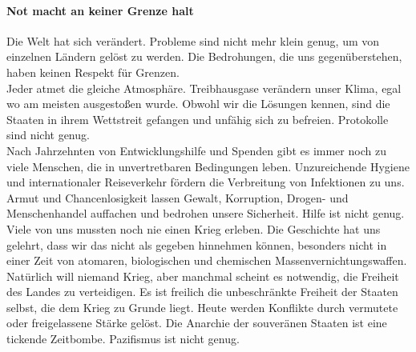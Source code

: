 \documentclass[11pt,a4paper]{article}
\begin{document}
\paragraph{Not macht an keiner Grenze halt}

Die Welt hat sich verändert. Probleme sind nicht mehr klein genug, um von einzelnen Ländern gelöst zu werden. Die Bedrohungen, die uns gegenüberstehen, haben keinen Respekt für Grenzen.\\
\noindent Jeder atmet die gleiche Atmosphäre.
Treibhausgase verändern unser Klima, egal wo am meisten ausgestoßen wurde.
Obwohl wir die Lösungen kennen, sind die Staaten in ihrem Wettstreit gefangen und unfähig sich zu befreien. \hfill Protokolle sind nicht genug.\\
\noindent Nach Jahrzehnten von Entwicklungshilfe und Spenden gibt es immer noch zu viele Menschen, die in unvertretbaren Bedingungen leben.
Unzureichende Hygiene und internationaler Reiseverkehr fördern die Verbreitung von Infektionen zu uns.
Armut und Chancenlosigkeit lassen Gewalt, Korruption, Drogen- und Menschenhandel auffachen und bedrohen unsere Sicherheit.
\hfill Hilfe ist nicht genug.\\
\noindent Viele von uns mussten noch nie einen Krieg erleben.
Die Geschichte hat uns gelehrt, dass wir das nicht als gegeben hinnehmen können, besonders nicht in einer Zeit von atomaren, biologischen und chemischen Massenvernichtungswaffen.
Natürlich will niemand Krieg, aber manchmal scheint es notwendig, die Freiheit des Landes zu verteidigen.
Es ist freilich die unbeschränkte Freiheit der Staaten selbst, die dem Krieg zu Grunde liegt.
Heute werden Konflikte durch vermutete oder freigelassene Stärke gelöst.
Die Anarchie der souveränen Staaten ist eine tickende Zeitbombe. \hfill Pazifismus ist nicht genug.
\end{document}
